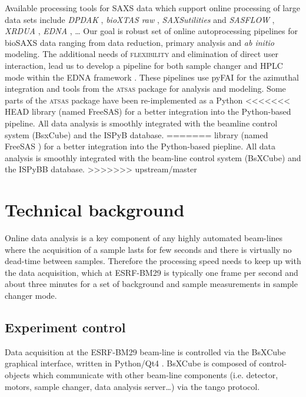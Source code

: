 \documentclass[preprint,pdf]{iucr}              %
\begin{document}
Available processing tools for SAXS data which support online processing of
large data sets include \textit{DPDAK} \cite{DPDAK}, \textit{bioXTAS raw}
\cite{BioXTASraw}, \textit{SAXSutilities} \cite{SAXSUtilities} and
\textit{SASFLOW} \cite{X33P,P12},  \textit{XRDUA} \cite{XRDUA}, \textit{EDNA}
, \ldots 
Our goal is robust set of online autoprocessing pipelines
for bioSAXS data ranging from data reduction, primary analysis and \textit{ab
initio} modeling.
The additional needs of \textsc{flexibility} and elimination of
direct user interaction, lead us to develop a pipeline for both sample changer and HPLC mode within the
EDNA framework \cite{edna}.
These pipelines use pyFAI for the azimuthal integration \cite{pyFAI} and tools
from the \textsc{atsas} package \cite{ATSAS1, ATSAS2} for analysis and modeling.
Some parts of the \textsc{atsas} package have been re-implemented as a Python
<<<<<<< HEAD
library (named FreeSAS) for a better integration into the Python-based pipeline. 
All data analysis is smoothly integrated with the beamline control system
(BsxCube) and the ISPyB database.
=======
library (named FreeSAS \cite{freesas}) for a better integration into the
Python-based piepline.
All data analysis is smoothly integrated with the beam-line control system
(BsXCube) and the ISPyBB \cite{ISPYBB} database.
>>>>>>> upstream/master

\section{Technical background}

Online data analysis is a key component of any highly automated beam-lines
where the acquisition of a sample lasts for few seconds and there is
virtually no dead-time between samples.
Therefore the processing speed needs to keep up with the data acquisition, which
at ESRF-BM29 is typically one frame per second and about three minutes for a set
of background and sample measurements in sample changer mode.


\subsection{Experiment control}
Data acquisition at the ESRF-BM29 beam-line is controlled via the BsXCube
graphical interface, written in Python/Qt4 \cite{pyqt}.
BsXCube is composed of control-objects which communicate with other beam-line
components (i.e. detector, motors, sample changer, data analysis server\ldots)
via the tango protocol\cite{tango}.
\end{document}
